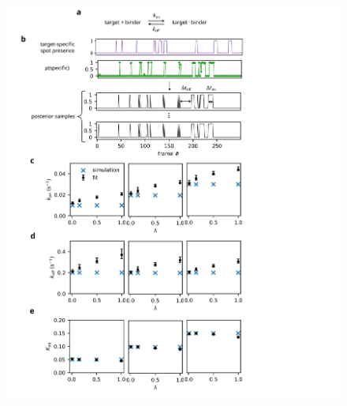 \begin{figure}[h]
\centering
\includegraphics[width=130mm]{figures/figure6/figure6.png}

\end{figure}
